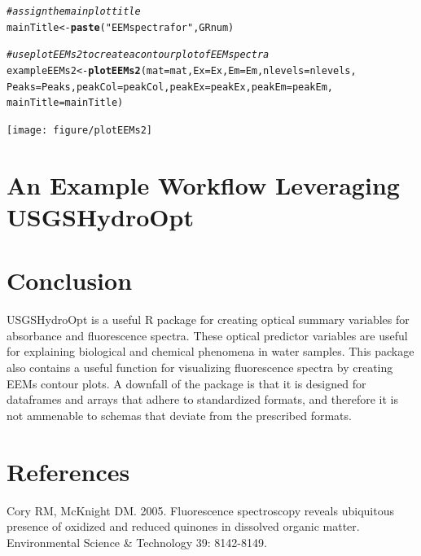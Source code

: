 \documentclass[a4paper,11pt]{article}\usepackage[]{graphicx}\usepackage[]{color}
\makeatletter
\newcommand{\hlstr}[1]{\textcolor[rgb]{0.192,0.494,0.8}{#1}}%
\newcommand{\hlcom}[1]{\textcolor[rgb]{0.678,0.584,0.686}{\textit{#1}}}%
\newcommand{\hlstd}[1]{\textcolor[rgb]{0.345,0.345,0.345}{#1}}%
\newcommand{\hlkwb}[1]{\textcolor[rgb]{0.69,0.353,0.396}{#1}}%
\newcommand{\hlkwc}[1]{\textcolor[rgb]{0.333,0.667,0.333}{#1}}%
\newcommand{\hlkwd}[1]{\textcolor[rgb]{0.737,0.353,0.396}{\textbf{#1}}}%
\newenvironment{kframe}{%
 \def\at@end@of@kframe{}%
 \ifinner\ifhmode%
  \def\at@end@of@kframe{\end{minipage}}%
  \begin{minipage}{\columnwidth}%
 \fi\fi%
 \def\FrameCommand##1{\hskip\@totalleftmargin \hskip-\fboxsep
 \colorbox{shadecolor}{##1}\hskip-\fboxsep
     \hskip-\linewidth \hskip-\@totalleftmargin \hskip\columnwidth}%
 \MakeFramed {\advance\hsize-\width
   \@totalleftmargin\z@ \linewidth\hsize
   \@setminipage}}%
 {\par\unskip\endMakeFramed%
 \at@end@of@kframe}
\newenvironment{knitrout}{}{} %
\makeatother
\begin{document}
\begin{knitrout}
\begin{kframe}
\begin{alltt}
\hlcom{# assign the main plot title}
\hlstd{mainTitle} \hlkwb{<-} \hlkwd{paste}\hlstd{(}\hlstr{"EEM spectra for"}\hlstd{, GRnum)}

\hlcom{# use plotEEMs2 to create a contour plot of EEM spectra}
\hlstd{exampleEEMs2} \hlkwb{<-} \hlkwd{plotEEMs2}\hlstd{(}\hlkwc{mat} \hlstd{= mat,} \hlkwc{Ex} \hlstd{= Ex,} \hlkwc{Em} \hlstd{= Em,} \hlkwc{nlevels} \hlstd{= nlevels,}
    \hlkwc{Peaks} \hlstd{= Peaks,} \hlkwc{peakCol} \hlstd{= peakCol,} \hlkwc{peakEx} \hlstd{= peakEx,} \hlkwc{peakEm} \hlstd{= peakEm,}
    \hlkwc{mainTitle} \hlstd{= mainTitle)}
\end{alltt}
\end{kframe}
\texttt{[image: figure/plotEEMs2]} 

\end{knitrout}

\section{An Example Workflow Leveraging USGSHydroOpt}

\section{Conclusion}
USGSHydroOpt is a useful R package for creating optical summary variables for absorbance and fluorescence spectra. These optical predictor variables are useful for explaining biological and chemical phenomena in water samples. This package also contains a useful function for visualizing fluorescence spectra by creating EEMs contour plots. A downfall of the package is that it is designed for dataframes and arrays that adhere to standardized formats, and therefore it is not ammenable to schemas that deviate from the prescribed formats.


\section{References}
Cory RM, McKnight DM. 2005. Fluorescence spectroscopy reveals ubiquitous presence of oxidized and reduced quinones in dissolved organic matter. Environmental Science & Technology 39: 8142-8149.
\end{document}
